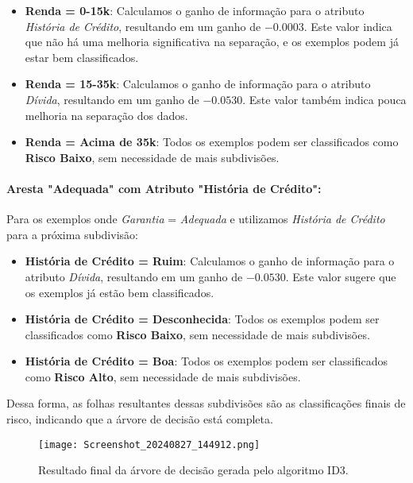 \documentclass[a4paper,12pt]{article}
\begin{document}
\begin{itemize}
    \item \textbf{Renda = 0-15k}: Calculamos o ganho de informação para o atributo \textit{História de Crédito}, resultando em um ganho de \(-0.0003\). Este valor indica que não há uma melhoria significativa na separação, e os exemplos podem já estar bem classificados.
    \item \textbf{Renda = 15-35k}: Calculamos o ganho de informação para o atributo \textit{Dívida}, resultando em um ganho de \(-0.0530\). Este valor também indica pouca melhoria na separação dos dados.
    \item \textbf{Renda = Acima de 35k}: Todos os exemplos podem ser classificados como \textbf{Risco Baixo}, sem necessidade de mais subdivisões.
\end{itemize}

\paragraph{Aresta "Adequada" com Atributo "História de Crédito":}
Para os exemplos onde \textit{Garantia} = \textit{Adequada} e utilizamos \textit{História de Crédito} para a próxima subdivisão:

\begin{itemize}
    \item \textbf{História de Crédito = Ruim}: Calculamos o ganho de informação para o atributo \textit{Dívida}, resultando em um ganho de \(-0.0530\). Este valor sugere que os exemplos já estão bem classificados.
    \item \textbf{História de Crédito = Desconhecida}: Todos os exemplos podem ser classificados como \textbf{Risco Baixo}, sem necessidade de mais subdivisões.
    \item \textbf{História de Crédito = Boa}: Todos os exemplos podem ser classificados como \textbf{Risco Alto}, sem necessidade de mais subdivisões.
\end{itemize}

Dessa forma, as folhas resultantes dessas subdivisões são as classificações finais de risco, indicando que a árvore de decisão está completa.

\begin{figure}[H]
    \centering
    \texttt{[image: Screenshot\_20240827\_144912.png]} %
    \caption{Resultado final da árvore de decisão gerada pelo algoritmo ID3.}
    \label{fig:resultado-id3}
\end{figure}
\end{document}
